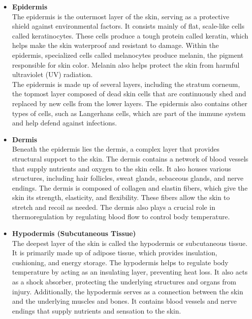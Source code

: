 \begin{itemize}
 \item \textbf{Epidermis} \\
 
The epidermis is the outermost layer of the skin, serving as a protective shield against environmental factors. It consists mainly of flat, scale-like cells called keratinocytes. These cells produce a tough protein called keratin, which helps make the skin waterproof and resistant to damage. Within the epidermis, specialized cells called melanocytes produce melanin, the pigment responsible for skin color. Melanin also helps protect the skin from harmful ultraviolet (UV) radiation. \\

The epidermis is made up of several layers, including the stratum corneum, the topmost layer composed of dead skin cells that are continuously shed and replaced by new cells from the lower layers. The epidermis also contains other types of cells, such as Langerhans cells, which are part of the immune system and help defend against infections.

\item \textbf{Dermis} \\

Beneath the epidermis lies the dermis, a complex layer that provides structural support to the skin. The dermis contains a network of blood vessels that supply nutrients and oxygen to the skin cells. It also houses various structures, including hair follicles, sweat glands, sebaceous glands, and nerve endings.
The dermis is composed of collagen and elastin fibers, which give the skin its strength, elasticity, and flexibility. These fibers allow the skin to stretch and recoil as needed. The dermis also plays a crucial role in thermoregulation by regulating blood flow to control body temperature.

\item \textbf{Hypodermis (Subcutaneous Tissue)} \\

The deepest layer of the skin is called the hypodermis or subcutaneous tissue. It is primarily made up of adipose tissue, which provides insulation, cushioning, and energy storage. The hypodermis helps to regulate body temperature by acting as an insulating layer, preventing heat loss. It also acts as a shock absorber, protecting the underlying structures and organs from injury.
Additionally, the hypodermis serves as a connection between the skin and the underlying muscles and bones. It contains blood vessels and nerve endings that supply nutrients and sensation to the skin.

\end{itemize}

